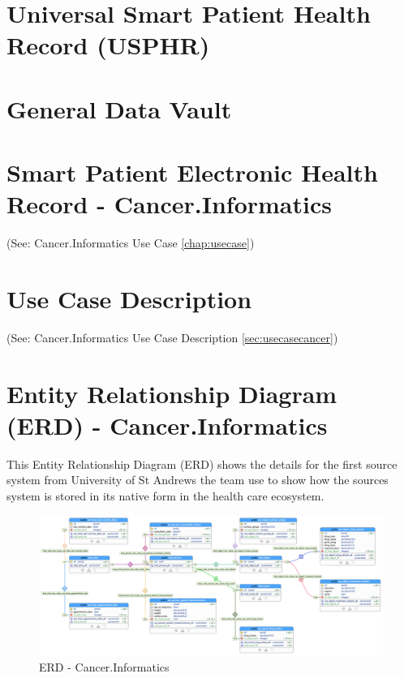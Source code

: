\section{Universal Smart Patient Health Record (USPHR)}



\section{General Data Vault}



\section{Smart Patient Electronic Health Record - Cancer.Informatics}

(See: Cancer.Informatics Use Case \ref{chap:usecase})

\section{Use Case Description}

(See: Cancer.Informatics Use Case Description \ref{sec:usecasecancer})

\section{Entity Relationship Diagram (ERD) - Cancer.Informatics}

This Entity Relationship Diagram (ERD) shows the details for the first source system from University of St Andrews the team use to show how the sources system is stored in its native form in the health care ecosystem.

\begin{figure}[H]
    \centering
    \includegraphics[width=14cm]{figures/technical/dv_chemocare_treatment_db.png}
    \caption{ERD - Cancer.Informatics}
    \label{fig:figERD_CancerInformatics}
\end{figure}


